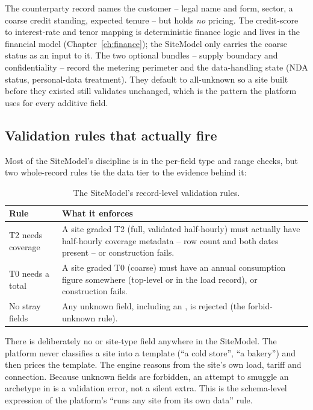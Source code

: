 The counterparty record names the customer -- legal name and form, sector, a coarse credit standing, expected tenure -- but holds \emph{no} pricing. The credit-score to interest-rate and tenor mapping is deterministic finance logic and lives in the financial model (Chapter~\ref{ch:finance}); the SiteModel only carries the coarse status as an input to it. The two optional bundles -- supply boundary and confidentiality -- record the metering perimeter and the data-handling state (NDA status, personal-data treatment). They default to all-unknown so a site built before they existed still validates unchanged, which is the pattern the platform uses for every additive field.

\subsection{Validation rules that actually fire}

Most of the SiteModel's discipline is in the per-field type and range checks, but two whole-record rules tie the data tier to the evidence behind it:

\begin{table}[H]
\centering
\caption{The SiteModel's record-level validation rules.}
\label{tab:sitevalid}
\small\sffamily
\begin{tabularx}{\textwidth}{@{}l L@{}}
\toprule
\textbf{Rule} & \textbf{What it enforces} \\
\midrule
T2 needs coverage & A site graded T2 (full, validated half-hourly) must actually have half-hourly coverage metadata -- row count and both dates present -- or construction fails. \\
T0 needs a total & A site graded T0 (coarse) must have an annual consumption figure somewhere (top-level or in the load record), or construction fails. \\
No stray fields & Any unknown field, including an , is rejected (the forbid-unknown rule). \\
\bottomrule
\end{tabularx}
\end{table}

\begin{caution}
There is deliberately no  or site-type field anywhere in the SiteModel. The platform never classifies a site into a template (``a cold store'', ``a bakery'') and then prices the template. The engine reasons from the site's own load, tariff and connection. Because unknown fields are forbidden, an attempt to smuggle an archetype in is a validation error, not a silent extra. This is the schema-level expression of the platform's ``runs any site from its own data'' rule.
\end{caution}

